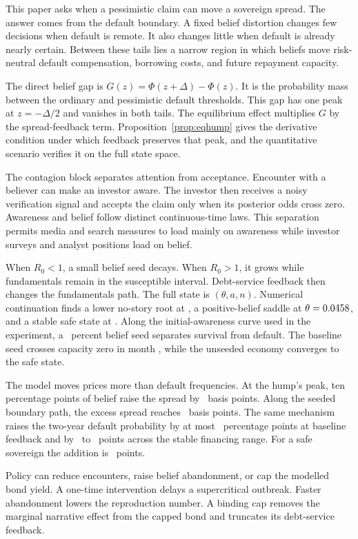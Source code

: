 \documentclass[11pt]{article}
\theoremstyle{definition}
\begin{document}
This paper asks when a pessimistic claim can move a sovereign spread. The answer comes from the default boundary. A fixed belief distortion changes few decisions when default is remote. It also changes little when default is already nearly certain. Between these tails lies a narrow region in which beliefs move risk-neutral default compensation, borrowing costs, and future repayment capacity.

The direct belief gap is $G(z)=\Phi(z+\Delta)-\Phi(z)$. It is the probability mass between the ordinary and pessimistic default thresholds. This gap has one peak at $z=-\Delta/2$ and vanishes in both tails. The equilibrium effect multiplies $G$ by the spread-feedback term. Proposition~\ref{prop:eqhump} gives the derivative condition under which feedback preserves that peak, and the quantitative scenario verifies it on the full state space.

The contagion block separates attention from acceptance. Encounter with a believer can make an investor aware. The investor then receives a noisy verification signal and accepts the claim only when its posterior odds cross zero. Awareness and belief follow distinct continuous-time laws. This separation permits media and search measures to load mainly on awareness while investor surveys and analyst positions load on belief.

When $R_0<1$, a small belief seed decays. When $R_0>1$, it grows while fundamentals remain in the susceptible interval. Debt-service feedback then changes the fundamentals path. The full state is $(\theta,a,n)$. Numerical continuation finds a lower no-story root at \LowerRoot, a positive-belief saddle at $\theta=0.0458$, and a stable safe state at \StableTheta. Along the initial-awareness curve used in the experiment, a \SeedThresholdPct\ percent belief seed separates survival from default. The baseline seed crosses capacity zero in month \ZoneDefMonth, while the unseeded economy converges to the safe state.

The model moves prices more than default frequencies. At the hump's peak, ten percentage points of belief raise the spread by \RelPeakTen\ basis points. Along the seeded boundary path, the excess spread reaches \PeakExcess\ basis points. The same mechanism raises the two-year default probability by at most \WedgePeak\ percentage points at baseline feedback and by \WedgeChiLo\ to \WedgeChiHi\ points across the stable financing range. For a safe sovereign the addition is \WedgeSafe\ points.

Policy can reduce encounters, raise belief abandonment, or cap the modelled bond yield. A one-time intervention delays a supercritical outbreak. Faster abandonment lowers the reproduction number. A binding cap removes the marginal narrative effect from the capped bond and truncates its debt-service feedback.
\end{document}
